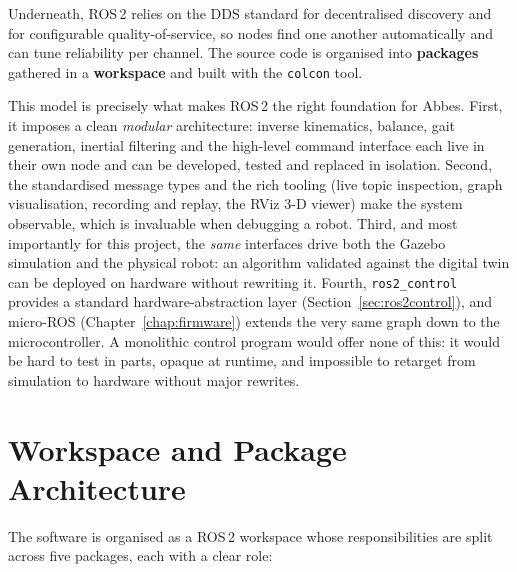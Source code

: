 Underneath, ROS\,2 relies on the DDS standard for decentralised discovery
and for configurable quality-of-service, so nodes find one another
automatically and can tune reliability per channel. The source code is
organised into \textbf{packages} gathered in a \textbf{workspace} and
built with the \texttt{colcon} tool.

This model is precisely what makes ROS\,2 the right foundation for Abbes.
First, it imposes a clean \emph{modular} architecture: inverse
kinematics, balance, gait generation, inertial filtering and the
high-level command interface each live in their own node and can be
developed, tested and replaced in isolation. Second, the standardised
message types and the rich tooling (live topic inspection, graph
visualisation, recording and replay, the RViz 3-D viewer) make the system
observable, which is invaluable when debugging a robot. Third, and most
importantly for this project, the \emph{same} interfaces drive both the
Gazebo simulation and the physical robot: an algorithm validated against
the digital twin can be deployed on hardware without rewriting it. Fourth,
\texttt{ros2\_control} provides a standard hardware-abstraction layer
(Section~\ref{sec:ros2control}), and micro-ROS (Chapter~\ref{chap:firmware})
extends the very same graph down to the microcontroller. A monolithic
control program would offer none of this: it would be hard to test in
parts, opaque at runtime, and impossible to retarget from simulation to
hardware without major rewrites.

\section{Workspace and Package Architecture}
\label{sec:packages}
The software is organised as a ROS\,2 workspace whose responsibilities are
split across five packages, each with a clear role:

